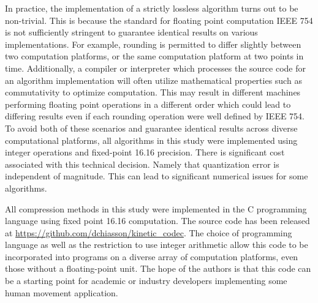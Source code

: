 \documentclass[journal]{IEEEtran}
\begin{document}
In practice, the implementation of a strictly lossless algorithm turns out to be non-trivial. This is because the standard for floating point computation IEEE 754 \cite{Society2008} is not sufficiently stringent to guarantee identical results on various implementations\cite{Monniaux2008}\cite{Goldberg1991}. For example, rounding is permitted to differ slightly between two computation platforms, or the same computation platform at two points in time. Additionally, a compiler or interpreter which processes the source code for an algorithm implementation will often utilize mathematical properties such as commutativity to optimize computation. This may result in different machines performing floating point operations in a different order which could lead to differing results even if each rounding operation were well defined by IEEE 754. To avoid both of these scenarios and guarantee identical results across diverse computational platforms, all algorithms in this study were implemented using integer operations and fixed-point 16.16 precision. There is significant cost associated with this technical decision. Namely that quantization error is independent of magnitude. This can lead to significant numerical issues for some algorithms.

All compression methods in this study were implemented in the C programming language using fixed point 16.16 computation. The source code has been released at \url{https://github.com/dchiasson/kinetic_codec}. The choice of programming language as well as the restriction to use integer arithmetic allow this code to be incorporated into programs on a diverse array of computation platforms, even those without a floating-point unit. The hope of the authors is that this code can be a starting point for academic or industry developers implementing some human movement application.
\end{document}
